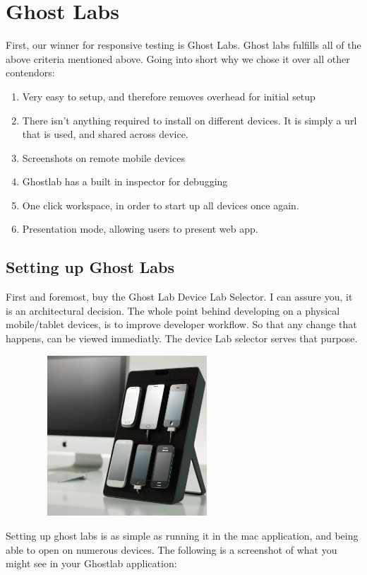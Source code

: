 \section{ Ghost Labs }

First, our winner for responsive testing is Ghost Labs. Ghost labs fulfills all
of the above criteria mentioned above. Going into short why we chose it over
all other contendors:
\begin{enumerate}
  \item Very easy to setup, and therefore removes overhead for initial setup
  \item There isn't anything required to install on different devices. It is
  simply a url that is used, and shared across device.
  \item Screenshots on remote mobile devices
  \item Ghostlab has a built in inspector for debugging
  \item One click workspace, in order to start up all devices once again.
  \item Presentation mode, allowing users to present web app.
\end{enumerate}

\subsection{ Setting up Ghost Labs }
First and foremost, buy the Ghost Lab Device Lab Selector. I can assure you, it
is an architectural decision. The whole point behind developing on a physical
mobile/tablet devices, is to improve developer workflow. So that any change that
happens, can be viewed immediatly. The device Lab selector serves that purpose.


\includegraphics[width=9.1cm, height=6cm]{pwa/pwa-toolset-physical-devices/device-lab-stand}

Setting up ghost labs is as simple as running it in the mac application, and
being able to open on numerous devices. The following is a screenshot of what
you might see in your Ghostlab application:


